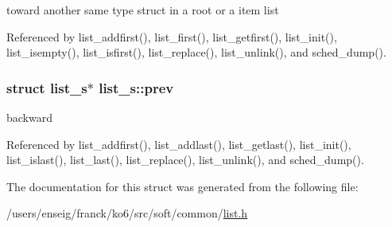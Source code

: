 toward another same type struct in a root or a item list 



Referenced by list\-\_\-addfirst(), list\-\_\-first(), list\-\_\-getfirst(), list\-\_\-init(), list\-\_\-isempty(), list\-\_\-isfirst(), list\-\_\-replace(), list\-\_\-unlink(), and sched\-\_\-dump().

\hypertarget{structlist__s_af220645f4ec4f64798bc6d8ea9765185}{
\subsubsection[{prev}]{\setlength{\rightskip}{0pt plus 5cm}struct {\bf list\-\_\-s}$\ast$ list\-\_\-s\-::prev}}\label{structlist__s_af220645f4ec4f64798bc6d8ea9765185}


backward 



Referenced by list\-\_\-addfirst(), list\-\_\-addlast(), list\-\_\-getlast(), list\-\_\-init(), list\-\_\-islast(), list\-\_\-last(), list\-\_\-replace(), list\-\_\-unlink(), and sched\-\_\-dump().



The documentation for this struct was generated from the following file\-:\begin{DoxyCompactItemize}
\item 
/users/enseig/franck/ko6/src/soft/common/\hyperlink{list_8h}{list.\-h}\end{DoxyCompactItemize}
